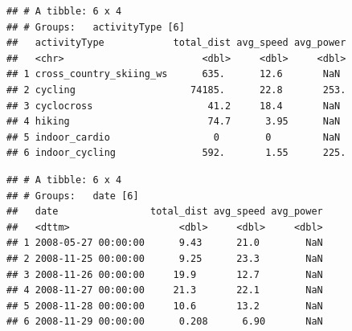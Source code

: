 \documentclass[
]{book}
\newenvironment{Shaded}{\begin{snugshade}}{\end{snugshade}}
\newcommand{\DataTypeTok}[1]{\textcolor[rgb]{0.13,0.29,0.53}{#1}}
\newcommand{\KeywordTok}[1]{\textcolor[rgb]{0.13,0.29,0.53}{\textbf{#1}}}
\newcommand{\NormalTok}[1]{#1}
\newcommand{\OperatorTok}[1]{\textcolor[rgb]{0.81,0.36,0.00}{\textbf{#1}}}
\newcommand{\StringTok}[1]{\textcolor[rgb]{0.31,0.60,0.02}{#1}}
\begin{document}
\begin{Shaded}
\end{Shaded}

\begin{verbatim}
## # A tibble: 6 x 4
## # Groups:   activityType [6]
##   activityType            total_dist avg_speed avg_power
##   <chr>                        <dbl>     <dbl>     <dbl>
## 1 cross_country_skiing_ws      635.      12.6       NaN 
## 2 cycling                    74185.      22.8       253.
## 3 cyclocross                    41.2     18.4       NaN 
## 4 hiking                        74.7      3.95      NaN 
## 5 indoor_cardio                  0        0         NaN 
## 6 indoor_cycling               592.       1.55      225.
\end{verbatim}

\begin{Shaded}
\end{Shaded}

\begin{verbatim}
## # A tibble: 6 x 4
## # Groups:   date [6]
##   date                total_dist avg_speed avg_power
##   <dttm>                   <dbl>     <dbl>     <dbl>
## 1 2008-05-27 00:00:00      9.43      21.0        NaN
## 2 2008-11-25 00:00:00      9.25      23.3        NaN
## 3 2008-11-26 00:00:00     19.9       12.7        NaN
## 4 2008-11-27 00:00:00     21.3       22.1        NaN
## 5 2008-11-28 00:00:00     10.6       13.2        NaN
## 6 2008-11-29 00:00:00      0.208      6.90       NaN
\end{verbatim}
\end{document}
